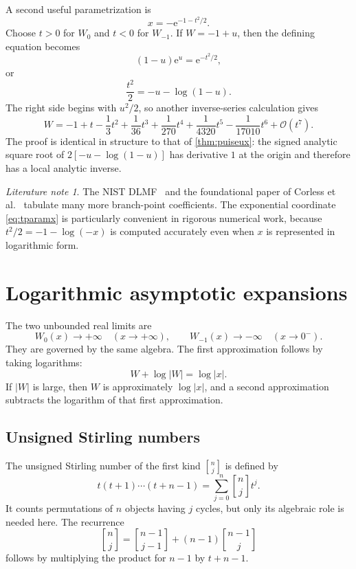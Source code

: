 \documentclass[11pt]{article}
\theoremstyle{remark}
\newtheorem{literaturenote}[literaturenote]{Literature note}
\newcommand{\Wz}{W_0}
\newcommand{\Wm}{W_{-1}}
\newcommand{\ee}{\mathrm e}
\newcommand{\bigO}{\mathcal O}
\newcommand{\stirling}[2]{\genfrac{[}{]}{0pt}{}{#1}{#2}}
\newcommand{\abs}[1]{\left|#1\right|}
\begin{document}
A second useful parametrization is
\begin{equation}\label{eq:tparamx}
       x=-\ee^{-1-t^2/2}.
\end{equation}
Choose \(t>0\) for \(W_0\) and \(t<0\) for \(W_{-1}\).  If
\(W=-1+u\), then the defining equation becomes
\[
       (1-u)\ee^u=\ee^{-t^2/2},
\]
or
\begin{equation}\label{eq:t-u-relation}
       \frac{t^2}{2}=-u-\log(1-u).
\end{equation}
The right side begins with \(u^2/2\), so another inverse-series calculation
gives
\begin{equation}\label{eq:tseries}
 W=-1+t-\frac13t^2+\frac1{36}t^3+\frac1{270}t^4
      +\frac1{4320}t^5-\frac1{17010}t^6+\bigO(t^7).
\end{equation}
The proof is identical in structure to that of
\cref{thm:puiseux}: the signed analytic square root of
\(2[-u-\log(1-u)]\) has derivative \(1\) at the origin and therefore has a
local analytic inverse.

\begin{literaturenote}
The NIST DLMF~\cite{dlmf} and the foundational paper of Corless et
al.~\cite{corless1996} tabulate many more branch-point coefficients.  The exponential coordinate
\eqref{eq:tparamx} is particularly convenient in rigorous numerical work,
because \(t^2/2=-1-\log(-x)\) is computed accurately even when \(x\) is
represented in logarithmic form.
\end{literaturenote}

\section{Logarithmic asymptotic expansions}\label{sec:asymptotics}

The two unbounded real limits are
\[
       \Wz(x)\longrightarrow+\infty\quad(x\to+\infty),
       \qquad
       \Wm(x)\longrightarrow-\infty\quad(x\to0^-).
\]
They are governed by the same algebra.  The first approximation follows by
taking logarithms:
\[
       W+\log\abs W=\log\abs x.
\]
If \(\abs W\) is large, then \(W\) is approximately \(\log\abs x\), and a
second approximation subtracts the logarithm of that first approximation.

\subsection{Unsigned Stirling numbers}

The unsigned Stirling number of the first kind
\(\stirling{n}{j}\) is defined by
\begin{equation}\label{eq:stirling-def}
 t(t+1)\cdots(t+n-1)
 =\sum_{j=0}^n\stirling{n}{j}t^j.
\end{equation}
It counts permutations of \(n\) objects having \(j\) cycles, but only its
algebraic role is needed here.  The recurrence
\begin{equation}\label{eq:stirling-rec}
 \stirling{n}{j}
 =\stirling{n-1}{j-1}+(n-1)\stirling{n-1}{j}
\end{equation}
follows by multiplying the product for \(n-1\) by \(t+n-1\).
\end{document}
